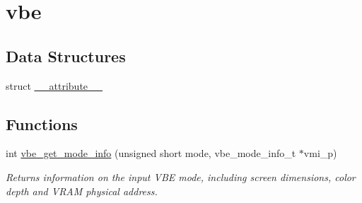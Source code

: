 \hypertarget{group__vbe}{}\section{vbe}
\label{group__vbe}
\subsection*{Data Structures}
\begin{DoxyCompactItemize}
\item 
struct \hyperlink{struct____attribute____}{\+\_\+\+\_\+attribute\+\_\+\+\_\+}
\end{DoxyCompactItemize}
\subsection*{Functions}
\begin{DoxyCompactItemize}
\item 
int \hyperlink{group__vbe_ga4ef3234e41f2050bc094a22049b69e45}{vbe\+\_\+get\+\_\+mode\+\_\+info} (unsigned short mode, vbe\+\_\+mode\+\_\+info\+\_\+t $\ast$vmi\+\_\+p)
\begin{DoxyCompactList}\small\item\em Returns information on the input V\+B\+E mode, including screen dimensions, color depth and V\+R\+A\+M physical address. \end{DoxyCompactList}\end{DoxyCompactItemize}
